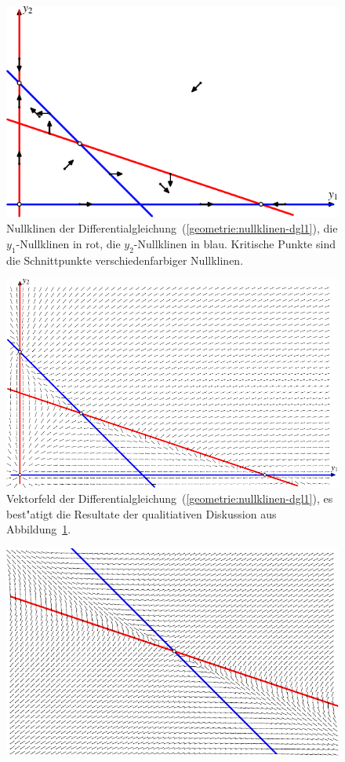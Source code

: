 \begin{beispiel}
\begin{figure}
\centering
\includegraphics{chapters/images/nullklinen-1.pdf}
\caption{Nullklinen der Differentialgleichung~(\ref{geometrie:nullklinen-dgl1}),
die $y_1$-Nullklinen in rot, die $y_2$-Nullklinen in blau.
Kritische Punkte sind die Schnittpunkte verschiedenfarbiger Nullklinen.
\label{geometrie:nullklinen1}}
\end{figure}
\begin{figure}
\centering
\includegraphics{chapters/images/nullklinen-2.pdf}
\caption{Vektorfeld der Differentialgleichung~(\ref{geometrie:nullklinen-dgl1}),
es best"atigt die Resultate der qualitiativen Diskussion aus
Abbildung~\ref{geometrie:nullklinen1}.
\label{geometrie:nullklinen-fluss}}
\end{figure}
\begin{figure}
\centering
\includegraphics{chapters/images/nullklinen-3.pdf}

\end{figure}
\end{beispiel}
